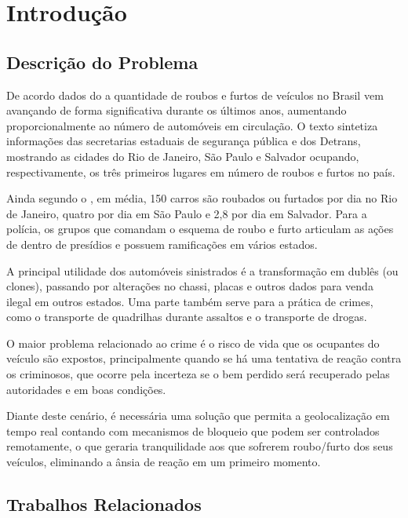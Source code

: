 \chapter {Introdu\c{c}\~{a}o}
\label{cap:introducao}

\section{Descri\c{c}\~{a}o do Problema}

De acordo dados do \textcite{denatran:2011} a quantidade de roubos e furtos de veículos no Brasil vem avançando de forma 
significativa durante os últimos anos, aumentando proporcionalmente ao número 
de automóveis em circulação. O texto sintetiza informações das secretarias estaduais de 
segurança pública e dos Detrans, mostrando as cidades do Rio de Janeiro, São Paulo e Salvador ocupando, respectivamente, os três primeiros lugares em número de roubos e furtos no país.

Ainda segundo o \textcite{denatran:2011}, em média, 150 carros são 
roubados ou furtados por dia no Rio de Janeiro, quatro por dia em São Paulo e 
2,8 por dia em Salvador. Para a polícia, os grupos que comandam o esquema de
roubo e furto articulam as ações de dentro de presídios e possuem ramificações
em vários estados. 

A principal utilidade dos automóveis sinistrados é a transformação em dublês (ou clones), passando por alterações no chassi, placas e outros dados para venda ilegal em outros estados. Uma parte também serve para a prática de crimes, como o transporte de quadrilhas durante assaltos e o transporte de drogas.

O maior problema relacionado ao crime é o risco de vida que os ocupantes do veículo são expostos, principalmente quando se há uma tentativa de reação contra os criminosos, que ocorre pela incerteza se o bem perdido será recuperado pelas autoridades e em boas condições.

Diante deste cenário, é necessária uma solução que permita a geolocalização em tempo real contando com mecanismos de bloqueio que podem ser controlados remotamente, o que geraria tranquilidade aos que sofrerem roubo/furto dos seus veículos, eliminando a ânsia de reação em um primeiro momento.

\hfill

\section{Trabalhos Relacionados}	


